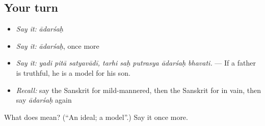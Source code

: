 \subsection*{Your turn}
\begin{itemize}
\raggedright
  \item \emph{Say it:} \emph{ādarśaḥ}
  \item \emph{Say it:} \emph{ādarśaḥ}, once more
  \item \emph{Say it:} \emph{yadi pitā satyavādī, tarhi saḥ putrasya ādarśaḥ bhavati.} — If a father is truthful, he is a model for his son.
  \item \emph{Recall:} say the Sanskrit for mild-mannered, then the Sanskrit for in vain, then say \emph{ādarśaḥ} again
\end{itemize}

\begin{tcolorbox}[breakable,colback=teal!4,colframe=teal!35!black,title={Before you move on}]
What does  mean? (\textquotedblleft{}An ideal; a model\textquotedblright{}.) Say it once more.
\end{tcolorbox}
